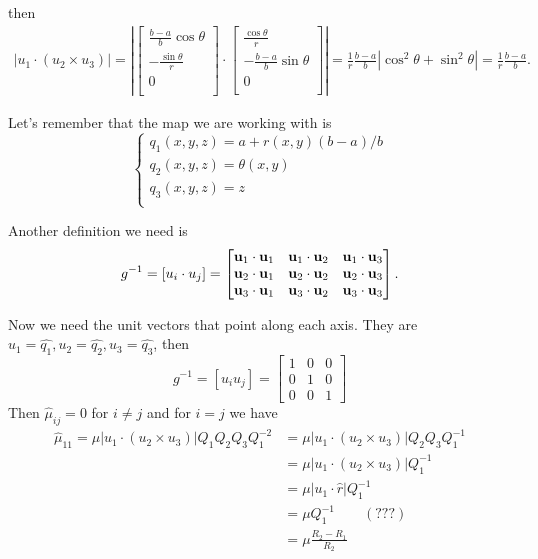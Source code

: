 \documentclass{amsart}
\begin{document}
then
\begin{align}
  |u_1\cdot(u_2\times u_3)|=
  \left|
  \begin{bmatrix}
    \frac{b-a}{b}\cos\theta\\
    -\frac{\sin\theta}{r}\\
    0\\
  \end{bmatrix}
  \cdot
  \begin{bmatrix}
    \frac{\cos\theta}{r}\\
    -\frac{b-a}{b}\sin\theta\\
    0\\
  \end{bmatrix}\right|
  =\frac{1}{r}\frac{b-a}{b}|\cos^2\theta+\sin^2\theta|=\frac{1}{r}\frac{b-a}{b}.
\end{align}


\newpage


Let's remember that the map we are working with is
\[\begin{cases}
  q_1(x,y,z)=a+r(x,y)(b-a)/b\\
  q_2(x,y,z)=\theta(x,y)\\
  q_3(x,y,z)=z\\
\end{cases}\]

Another definition we need is
\begin{equation}\label{matrixg}
  g^{-1}=[u_i\cdot u_j]=\begin{bmatrix}
    \textbf{u}_1\cdot \textbf{u}_1 & \textbf{u}_1\cdot \textbf{u}_2 & \textbf{u}_1\cdot \textbf{u}_3 \\
    \textbf{u}_2\cdot \textbf{u}_1 & \textbf{u}_2\cdot \textbf{u}_2 & \textbf{u}_2\cdot \textbf{u}_3 \\
    \textbf{u}_3\cdot \textbf{u}_1 & \textbf{u}_3\cdot \textbf{u}_2 & \textbf{u}_3\cdot \textbf{u}_3
  \end{bmatrix}.
\end{equation}

Now we need the unit vectors that point along each axis. They are $u_1=\widehat{q_1},u_2=\widehat{q_2},u_3=\widehat{q_3}$,
then
\[
  g^{-1}=
  [u_iu_j]=
  \begin{bmatrix}
    1 & 0 & 0\\
    0 & 1 & 0\\
    0 & 0 & 1
  \end{bmatrix}
\]
Then $\hat{\mu}_{ij}=0$ for $i\neq j$ and for $i=j$ we have
\begin{align*}
  \hat{\mu}_{11}=\mu|u_1\cdot(u_2\times u_3)|Q_1Q_2Q_3Q_1^{-2}
  &=\mu|u_1\cdot(u_2\times u_3)|Q_2Q_3Q_1^{-1}\\
  &=\mu|u_1\cdot(u_2\times u_3)|Q_1^{-1}\\
  &=\mu|u_1\cdot\hat{r}|Q_1^{-1}\\
  &=\mu Q_1^{-1}\qquad (???)\\
  &=\mu \frac{R_2-R_1}{R_2}
\end{align*}
\end{document}
